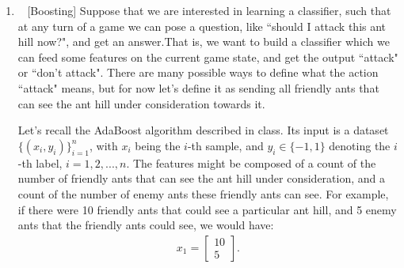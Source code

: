 \documentclass[10pt]{article}
\begin{document}
\begin{enumerate}[1.]
And with the definition of entropy: $H(\boldsymbol{X})=-\int p(\boldsymbol{x})\log p(\boldsymbol{x})d\boldsymbol{x}$, we can get that
$$-\int p(\boldsymbol{z}|\boldsymbol{X},\theta^{(t-1)})\log p(\boldsymbol{z}|\boldsymbol{X},\theta^{(t-1)})d\boldsymbol{z}=H(\boldsymbol{Z}|\boldsymbol{X},\theta^{(t-1)})$$

So 
$$\int p(\boldsymbol{z}|\boldsymbol{X},\theta^{(t-1)})\log p(\boldsymbol{X},\boldsymbol{z}|\theta)d\boldsymbol{z}-\int p(\boldsymbol{z}|\boldsymbol{X},\theta^{(t-1)})\log p(\boldsymbol{z}|\boldsymbol{X},\theta^{(t-1)})d\boldsymbol{z}$$
$$=Q(\theta|\theta^{(t-1)})+H(\boldsymbol{Z}|\boldsymbol{X},\theta^{(t-1)})$$

Since $H(\boldsymbol{Z}|\boldsymbol{X},\theta^{(t-1)})$ is a constant of $\theta$, so we can get that
$$\argmax\limits_{\theta} \mathbb{E}_{\boldsymbol{Z}|\boldsymbol{X},\theta^{(t-1)}}\left[\log \dfrac{p(\boldsymbol{X},\boldsymbol{Z}|\theta)}{p(\boldsymbol{Z}|\boldsymbol{X},\theta^{(t-1)})}\right]
=\argmax\limits_{\theta} Q(\theta|\theta^{(t-1)}) + H(\boldsymbol{Z}|\boldsymbol{X},\theta^{(t-1)})
=\argmax\limits_{\theta} Q(\theta|\theta^{(t-1)})$$

So above all, we have proved that
$$\argmax\limits_{\theta} Q(\theta|\theta^{(t-1)}) = \argmax\limits_{\theta} \mathbb{E}_{\boldsymbol{Z}|\boldsymbol{X},\theta^{(t-1)}}\left[\log \dfrac{p(\boldsymbol{X},\boldsymbol{Z}|\theta)}{p(\boldsymbol{Z}|\boldsymbol{X},\theta^{(t-1)})}\right]$$
          
	      \newpage

    \item ~ [Boosting]
        Suppose that we are interested in learning a classifier, such that at any turn of a game we can pose a question, like ``should I attack this ant hill now?", and get an answer.That is, we want to build a classifier which we can feed some features on the current game state, and get the output ``attack" or ``don't attack". There are many possible ways to define what the action ``attack" means, but for now let's define it as sending all friendly ants that can see the ant hill under consideration towards it.

	    Let's recall the AdaBoost algorithm described in class. Its input is a dataset $\{(x_{i},y_{i})\}_{i=1}^{n}$, with $x_i$ being the $i$-th sample, and $y_{i}\in \{-1,1\}$ denoting the $i$-th label, $i=1,2,...,n$. The features might be composed of a count of the number of friendly ants that can see the ant hill under consideration, and a count of the number of enemy ants these friendly ants can see. For example, if there were 10 friendly ants that could see a particular ant hill, and 5 enemy ants that the friendly ants could see, we would have:
	    \begin{align*}
		    x_1 = \begin{bmatrix}
			10 \\
			5
		    \end{bmatrix}.
	    \end{align*}


\end{enumerate}
\end{document}
